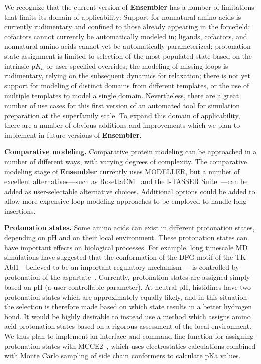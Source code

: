 \documentclass[aps,pre,twocolumn,nofootinbib,superscriptaddress,linenumbers]{revtex4-1}
\begin{document}
\color{red}
We recognize that the current version of {\bf Ensembler} has a number of limitations that limits its domain of applicability: Support for nonnatural amino acids is currently rudimentary and confined to those already appearing in the forcefield; cofactors cannot currently be automatically modeled in; ligands, cofactors, and nonnatural amino acids cannot yet be automatically parameterized; protonation state assignment is limited to selection of the most populated state based on the intrinsic p$K_a$ or user-specified overrides; the modeling of missing loops is rudimentary, relying on the subsequent dynamics for relaxation; there is not yet support for modeling of distinct domains from different templates, or the use of multiple templates to model a single domain.
Nevertheless, there are a great number of use cases for this first version of an automated tool for simulation preparation at the superfamily scale.
To expand this domain of applicability, there are a number of obvious additions and improvements which we plan to implement in future versions of {\bf Ensembler}.

{\bf Comparative modeling.}
Comparative protein modeling can be approached in a number of different ways, with varying degrees of complexity.
The comparative modeling stage of {\bf Ensembler} currently uses MODELLER, but a number of excellent alternatives---such as RosettaCM~\cite{baker:structure:2013:rosettacm} and the I-TASSER Suite~\cite{yang:nature-methods:2015:i-tasser-suite}---can be added as user-selectable alternative choices.
Additional options could be added to allow more expensive loop-modeling approaches to be employed to handle long insertions.

{\bf Protonation states.}
Some amino acids can exist in different protonation states, depending on pH and on their local environment.
These protonation states can have important effects on biological processes.
For example, long timescale MD simulations have suggested that the conformation of the DFG motif of the TK Abl1---believed to be an important regulatory mechanism~\cite{nagar:cell:2003:abl-1opl}---is controlled by protonation of the aspartate~\cite{shan:pnas:2009:abl}.
Currently, protonation states are assigned simply based on pH (a user-controllable parameter).
At neutral pH, histidines have two protonation states which are approximately equally likely, and in this situation the selection is therefore made based on which state results in a better hydrogen bond.
It would be highly desirable to instead use a method which assigns amino acid protonation states based on a rigorous assessment of the local environment.
We thus plan to implement an interface and command-line function for assigning protonation states with MCCE2~\cite{alexov-gunner:biophys-j:1997:mcce2,georgescu-alexov-gunner:biophys-j:2002:mcce2,song-mao-gunner:j-comput-chem:2009:mcce2}, which uses electrostatics calculations combined with Monte Carlo sampling of side chain conformers to calculate pKa values.
\end{document}
